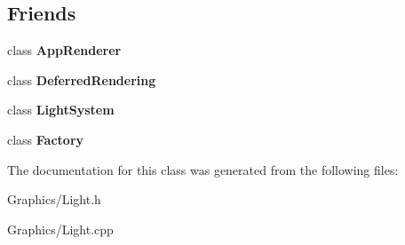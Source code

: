 \subsection*{Friends}
\begin{DoxyCompactItemize}
\item 
\mbox{\label{classLight_a5f3d064e51c4a3bf9409801632b9a7af}} 
class {\bfseries App\+Renderer}
\item 
\mbox{\label{classLight_a355bf32616f2e1751ee46bd315e905e5}} 
class {\bfseries Deferred\+Rendering}
\item 
\mbox{\label{classLight_acad5260b1bd2b9cbfe38d8f2471f072b}} 
class {\bfseries Light\+System}
\item 
\mbox{\label{classLight_a328c093d609680cca505905c6d49901a}} 
class {\bfseries Factory}
\end{DoxyCompactItemize}


The documentation for this class was generated from the following files\+:\begin{DoxyCompactItemize}
\item 
Graphics/Light.\+h\item 
Graphics/Light.\+cpp\end{DoxyCompactItemize}
